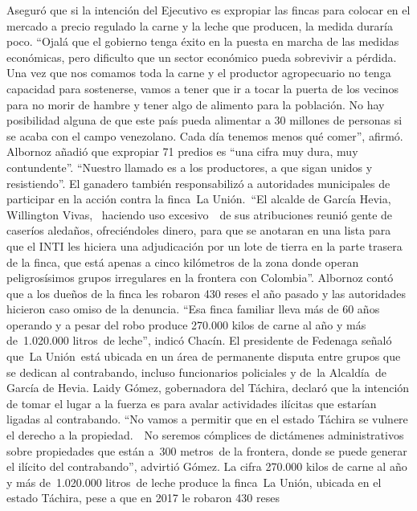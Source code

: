\documentclass{article}%
\begin{document}
\newline%
%
Aseguró que si la intención del Ejecutivo es expropiar las fincas para colocar en el mercado a precio regulado la carne y la leche que producen, la medida duraría poco. “Ojalá que el gobierno tenga éxito en la puesta en marcha de las medidas económicas, pero dificulto que un sector económico pueda sobrevivir a pérdida. Una vez que nos comamos toda la carne y el productor agropecuario no tenga capacidad para sostenerse, vamos a tener que ir a tocar la puerta de los vecinos para no morir de hambre y tener algo de alimento para la población. No hay posibilidad alguna de que este país pueda alimentar a 30 millones de personas si se acaba con el campo venezolano. Cada día tenemos menos qué comer”, afirmó.%
\newline%
%
Albornoz añadió que expropiar 71 predios es “una cifra muy dura, muy contundente”. “Nuestro llamado es a los productores, a que sigan unidos y resistiendo”.%
\newline%
%
El ganadero también responsabilizó a autoridades municipales de participar en la acción contra la finca~La Unión.~“El alcalde de García Hevia, Willington Vivas, ~haciendo uso excesivo~~de sus atribuciones reunió gente de caseríos aledaños, ofreciéndoles dinero, para que se anotaran en una lista para que el INTI les hiciera una adjudicación por un lote de tierra en la parte trasera de la finca, que está apenas a cinco kilómetros de la zona donde operan peligrosísimos grupos irregulares en la frontera con Colombia”.%
\newline%
%
Albornoz contó que a los dueños de la finca les robaron 430 reses el año pasado y las autoridades hicieron caso omiso de la denuncia. “Esa finca familiar lleva más de 60 años operando y a pesar del robo produce 270.000 kilos de carne al año y más de~1.020.000 litros~de leche”, indicó Chacín.%
\newline%
%
El presidente de Fedenaga señaló que~La Unión~está ubicada en un área de permanente disputa entre grupos que se dedican al contrabando, incluso funcionarios policiales y de~la Alcaldía~de García de Hevia.%
\newline%
%
Laidy Gómez, gobernadora del Táchira, declaró que la intención de tomar el lugar a la fuerza es para avalar actividades ilícitas que estarían ligadas al contrabando. “No vamos a permitir que en el estado Táchira se vulnere el derecho a la propiedad.~~No seremos cómplices de dictámenes administrativos sobre propiedades que están a~300 metros~de la frontera, donde se puede generar el ilícito del contrabando”, advirtió Gómez.%
\newline%
%
La cifra%
\newline%
%
270.000 kilos de carne al año y más de~1.020.000 litros~de leche produce la finca~La Unión, ubicada en el estado Táchira, pese a que en 2017 le robaron 430 reses%
\newline%
%
\end{document}
